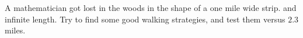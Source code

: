 A mathematician got lost in the woods in the shape of a one mile wide strip. and infinite length. Try to find some good walking strategies, and test them versus $2.3$ miles.
